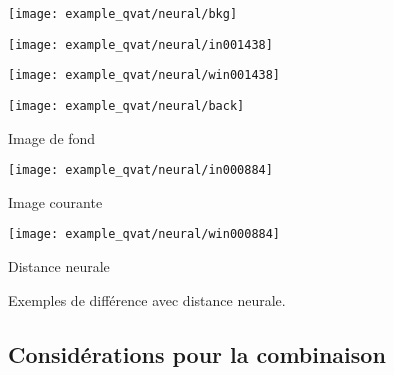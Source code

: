 	\begin{figureth}
		\begin{subfigureth}{.32\textwidth}
			\texttt{[image: example\_qvat/neural/bkg]}
		\end{subfigureth}
		\begin{subfigureth}{.32\textwidth}
			\texttt{[image: example\_qvat/neural/in001438]}
		\end{subfigureth}
		\begin{subfigureth}{.32\textwidth}
			\texttt{[image: example\_qvat/neural/win001438]}
		\end{subfigureth}

		\begin{subfigureth}{.32\textwidth}
			\texttt{[image: example\_qvat/neural/back]} \caption{Image de fond}
		\end{subfigureth}
		\begin{subfigureth}{.32\textwidth}
			\texttt{[image: example\_qvat/neural/in000884]} \caption{Image courante}
		\end{subfigureth}
		\begin{subfigureth}{.32\textwidth}
			\texttt{[image: example\_qvat/neural/win000884]} \caption{Distance neurale}
		\end{subfigureth}

		\caption{Exemples de différence avec distance neurale.}\label{fig:visu-tp}
	\end{figureth}

	\subsection{Considérations pour la combinaison}\label{seq:combinaison}
	
